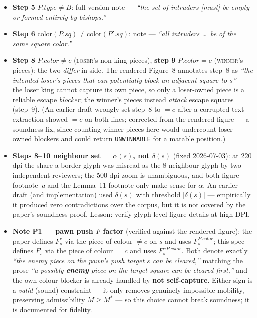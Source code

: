 \documentclass[11pt]{article}
\newcommand{\code}[1]{\texttt{#1}}
\theoremstyle{plain}
\theoremstyle{definition}
\newcommand{\sq}{\mathit{sq}}
\begin{document}
\begin{itemize}[leftmargin=1.4em]
  \item \textbf{Step 5} $P.\mathit{type} \ne B$: full-version note --- \emph{``the set of intruders [must] be empty or formed entirely by bishops.''}
  \item \textbf{Step 6} $\mathrm{color}(P.\sq) \ne \mathrm{color}(P'.\sq)$: note --- \emph{``all intruders \dots\ be of the same square color.''}
  \item \textbf{Step 8} $P.\mathit{color} \ne c$ (\textsc{loser}'s non-king pieces), \textbf{step 9} $P.\mathit{color} = c$ (\textsc{winner}'s pieces): the two \emph{differ} in side. The rendered Figure~8 annotates step~8 as \emph{``the intended loser's pieces that can potentially block an adjacent square to $s$''} --- the loser king cannot capture its own piece, so only a loser-owned piece is a reliable escape \emph{blocker}; the winner's pieces instead \emph{attack} escape squares (step~9). (An earlier draft wrongly set step~8 to $= c$ after a corrupted text extraction showed $= c$ on both lines; corrected from the rendered figure --- a soundness fix, since counting winner pieces here would undercount loser-owned blockers and could return \code{UNWINNABLE} for a matable position.)
  \item \textbf{Steps 8--10 neighbour set $= \alpha(s)$, not $\delta(s)$} (fixed 2026-07-03): at 220 dpi the share-a-border glyph was misread as the 8-neighbour glyph by two independent reviewers; the 500-dpi zoom is unambiguous, and both figure footnote~\emph{a} and the Lemma~11 footnote only make sense for $\alpha$. An earlier draft (and implementation) used $\delta(s)$ with threshold $|\delta(s)|$ --- empirically it produced zero contradictions over the corpus, but it is not covered by the paper's soundness proof. Lesson: verify glyph-level figure details at high DPI.
  \item \textbf{Note P1 --- pawn push $F$ factor} (verified against the rendered figure): the paper defines $F_s^c$ via the piece of colour $\ne c$ on $s$ and uses $F_s^{P.\mathit{color}}$; this spec defines $F_s^c$ via the piece of colour $= c$ and uses $F_s^{\neg P.\mathit{color}}$. Both denote exactly \emph{``the enemy piece on the pawn's push target $s$ can be cleared,''} matching the prose \emph{``a possibly \textbf{enemy} piece on the target square can be cleared first,''} and the own-colour blocker is already handled by \textbf{not self-capture}. Either sign is a \emph{valid} (sound) constraint --- it only removes genuinely impossible mobility, preserving admissibility $M \ge M^*$ --- so this choice cannot break soundness; it is documented for fidelity.
\end{itemize}
\end{document}
